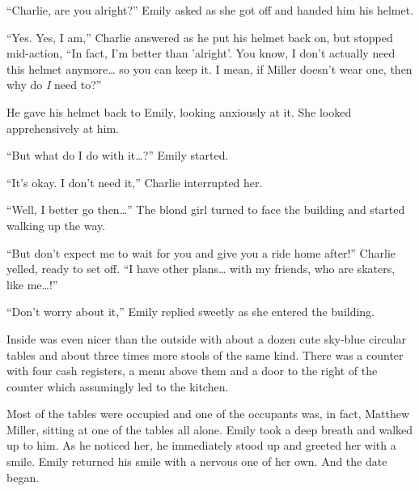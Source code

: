 “Charlie, are you alright?” Emily asked as she got off and handed him his helmet.

“Yes. Yes, I am,” Charlie answered as he put his helmet back on, but stopped mid-action, “In fact, I'm better than 'alright'. You know, I don't actually need this helmet anymore… so you can keep it. I mean, if Miller doesn't wear one, then why do \textit{I} need to?”

He gave his helmet back to Emily, looking anxiously at it. She looked apprehensively at him.

“But what do I do with it…?” Emily started.

“It's okay. I don't need it,” Charlie interrupted her.

“Well, I better go then…” The blond girl turned to face the building and started walking up the way.

“But don't expect me to wait for you and give you a ride home after!” Charlie yelled, ready to set off. “I have other plans… with my friends, who are skaters, like me…!”

“Don't worry about it,” Emily replied sweetly as she entered the building.

Inside was even nicer than the outside with about a dozen cute sky-blue circular tables and about three times more stools of the same kind. There was a counter with four cash registers, a menu above them and a door to the right of the counter which assumingly led to the kitchen.

Most of the tables were occupied and one of the occupants was, in fact, Matthew Miller, sitting at one of the tables all alone. Emily took a deep breath and walked up to him. As he noticed her, he immediately stood up and greeted her with a smile. Emily returned his smile with a nervous one of her own. And the date began.